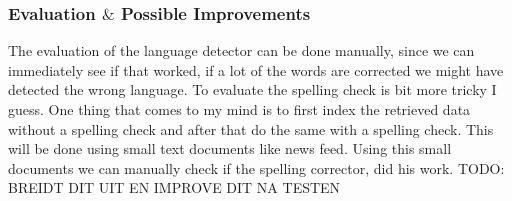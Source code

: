 \subsubsection*{Evaluation $\&$ Possible Improvements }
The evaluation of the language detector can be done manually, since we can immediately see if that worked, if a lot of the words are corrected we might have detected the wrong language. To evaluate the spelling check is bit more tricky I guess. One thing that comes to my mind is to first index the retrieved data without a spelling check and after that do the same with a spelling check. This will be done using small text documents like news feed. Using this small documents we can manually check if the spelling corrector, did his work.
TODO: BREIDT DIT UIT EN IMPROVE DIT NA TESTEN
